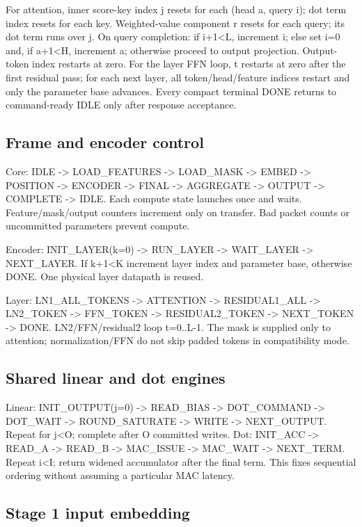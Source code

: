 \documentclass[11pt,a4paper]{article}
\begin{document}
For attention, inner score-key index j resets for each (head a, query i); dot term index resets for each key. Weighted-value component r resets for each query; its dot term runs over j. On query completion: if i+1<L, increment i; else set i=0 and, if a+1<H, increment a; otherwise proceed to output projection. Output-token index restarts at zero. For the layer FFN loop, t restarts at zero after the first residual pass; for each next layer, all token/head/feature indices restart and only the parameter base advances. Every compact terminal DONE returns to command-ready IDLE only after response acceptance.

\subsection{Frame and encoder control}

Core: IDLE -> LOAD\_FEATURES -> LOAD\_MASK -> EMBED -> POSITION -> ENCODER -> FINAL -> AGGREGATE -> OUTPUT -> COMPLETE -> IDLE. Each compute state launches once and waits. Feature/mask/output counters increment only on transfer. Bad packet counts or uncommitted parameters prevent compute.

Encoder: INIT\_LAYER(k=0) -> RUN\_LAYER -> WAIT\_LAYER -> NEXT\_LAYER. If k+1<K increment layer index and parameter base, otherwise DONE. One physical layer datapath is reused.

Layer: LN1\_ALL\_TOKENS -> ATTENTION -> RESIDUAL1\_ALL -> LN2\_TOKEN -> FFN\_TOKEN -> RESIDUAL2\_TOKEN -> NEXT\_TOKEN -> DONE. LN2/FFN/residual2 loop t=0..L-1. The mask is supplied only to attention; normalization/FFN do not skip padded tokens in compatibility mode.

\subsection{Shared linear and dot engines}

Linear: INIT\_OUTPUT(j=0) -> READ\_BIAS -> DOT\_COMMAND -> DOT\_WAIT -> ROUND\_SATURATE -> WRITE -> NEXT\_OUTPUT. Repeat for j<O; complete after O committed writes. Dot: INIT\_ACC -> READ\_A -> READ\_B -> MAC\_ISSUE -> MAC\_WAIT -> NEXT\_TERM. Repeat i<I; return widened accumulator after the final term. This fixes sequential ordering without assuming a particular MAC latency.

\subsection{Stage 1 input embedding}
\end{document}
